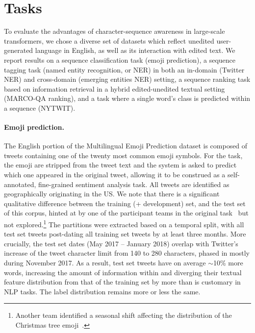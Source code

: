 \section{Tasks}
\label{sec:tasks}

To evaluate the advantages of character-sequence awareness in large-scale transformers, we chose a diverse set of datasets which reflect unedited user-generated language in English, as well as its interaction with edited text.
We report results on a sequence classification task (emoji prediction), a sequence tagging task (named entity recognition, or NER) in both an in-domain (Twitter NER) and cross-domain (emerging entities NER) setting, a sequence ranking task based on information retrieval in a hybrid edited-unedited textual setting (MARCO-QA ranking), and a task where a single word's class is predicted within a sequence (NYTWIT).

\paragraph{Emoji prediction.}
The English portion of the Multilingual Emoji Prediction dataset \cite{barbieri-etal-2018-semeval,ma-etal-2020-multi} is composed of tweets containing one of the twenty most common emoji symbols.
For the task, the emoji are stripped from the tweet text and the system is asked to predict which one appeared in the original tweet, allowing it to be construed as a self-annotated, fine-grained sentiment analysis task.
All tweets are identified as geographically originating in the US.
We note that there is a significant qualitative difference between the training (+ development) set, and the test set of this corpus, hinted at by one of the participant teams in the original task~\cite{chen-etal-2018-peperomia} but not explored.\footnote{Another team identified a seasonal shift affecting the distribution of the Christmas tree 
emoji~\cite{coster-etal-2018-hatching}.}
The partitions were extracted based on a temporal split, with all test set tweets post-dating all training set tweets by at least three months. %
More crucially, the test set dates (May 2017 -- January 2018) overlap with Twitter's increase of the tweet character limit from 140 to 280 characters, phased in mostly during November 2017.
As a result, test set tweets have on average $\sim$10\% more words, increasing the amount of information within and diverging their textual feature distribution from that of the training set by more than is customary in NLP tasks.
The label distribution remains more or less the same.

